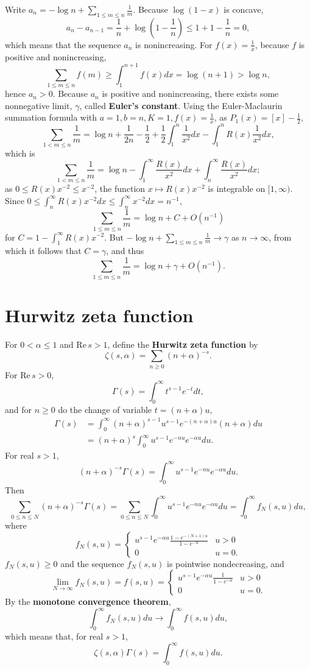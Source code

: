 \documentclass{article}
\def\Re{\ensuremath{\mathrm{Re}}\,}
\theoremstyle{definition}
\theoremstyle{definition}
\begin{document}
Write $a_n  = - \log n+ \sum_{1 \leq m \leq n} \frac{1}{m}$. Because $\log(1-x)$ is concave,
\[
a_n - a_{n-1} = \frac{1}{n} + \log\left(1-\frac{1}{n} \right) \leq 1 + 1 - \frac{1}{n}=0,
\] 
which means that the sequence $a_n$ is nonincreasing. For $f(x)=\frac{1}{x}$, because
$f$ is positive and nonincreasing,
\[
\sum_{1 \leq m \leq n} f(m) \geq \int_1^{n+1} f(x) dx = \log(n+1) > \log n,
\]
hence $a_n>0$. Because $a_n$ is positive and nonincreasing, there exists some nonnegative limit,
$\gamma$, called \textbf{Euler's constant}. 
Using the Euler-Maclaurin summation formula with $a=1, b=n, K=1, f(x)=\frac{1}{x}$, as $P_1(x) = [x]-\frac{1}{2}$,
\[
\sum_{1 < m \leq n} \frac{1}{m} = \log n + \frac{1}{2n} - \frac{1}{2} + \frac{1}{2} \int_1^n \frac{1}{x^2} dx - \int_1^n R(x) \frac{1}{x^2} dx,
\]
which is
\[
\sum_{1<m \leq n} \frac{1}{m} = \log n - \int_1^\infty \frac{R(x)}{x^2} dx + \int_n^\infty \frac{R(x)}{x^2} dx;
\]
as $0 \leq R(x) x^{-2} \leq x^{-2}$, the function $x \mapsto R(x)x^{-2}$ is integrable
on $[1,\infty)$. Since $0 \leq \int_n^\infty R(x)x^{-2} dx \leq \int_n^\infty x^{-2} dx = n^{-1}$, 
\[
\sum_{1 \leq m \leq n} \frac{1}{m} = \log n + C + O(n^{-1})
\]
for $C=1-\int_1^\infty R(x)x^{-2}$. But $-\log n + \sum_{1 \leq m \leq n} \frac{1}{m} \to \gamma$ as $n \to \infty$, from which it follows that
$C=\gamma$, and thus
\[
\sum_{1 \leq m \leq n} \frac{1}{m} = \log n + \gamma + O(n^{-1}).
\]



\section{Hurwitz zeta function}
For $0<\alpha \leq 1$ and $\Re s>1$, define the \textbf{Hurwitz zeta function} by
\[
\zeta(s,\alpha) = \sum_{n \geq 0} (n+\alpha)^{-s}.
\]
For $\Re s>0$,
\[
\Gamma(s) = \int_0^\infty t^{s-1} e^{-t} dt,
\]
and for $n \geq 0$ do the change of variable $t = (n+\alpha) u$,
\begin{align*}
\Gamma(s) &= \int_0^\infty (n+\alpha)^{s-1} u^{s-1} e^{-(n+\alpha)u} (n+\alpha) du\\
&=(n+\alpha)^s \int_0^\infty u^{s-1} e^{-nu} e^{-\alpha u} du.
\end{align*}
For real $s>1$,
\[
(n+\alpha)^{-s} \Gamma(s) = \int_0^\infty u^{s-1} e^{-nu} e^{-\alpha u} du.
\]
Then
\[
\sum_{0 \leq n \leq N} (n+\alpha)^{-s} \Gamma(s) = \sum_{0 \leq n \leq N}\int_0^\infty u^{s-1} e^{-nu} e^{-\alpha u} du=\int_0^\infty f_N(s,u) du,
\]
where
\[
f_N(s,u) = \begin{cases}
u^{s-1} e^{-\alpha u} \frac{1-e^{-(N+1)u}}{1-e^{-u}} &u>0\\
0&u=0.
\end{cases}
\]
$f_N(s,u) \geq 0$ and the sequence $f_N(s,u)$ is pointwise nondecreasing, and
\[
\lim_{N \to \infty} f_N(s,u) =  f(s,u) = \begin{cases}
u^{s-1} e^{-\alpha u} \frac{1}{1-e^{-u}} &u>0\\
0&u=0.
\end{cases}
\]
By the \textbf{monotone convergence theorem},
\[
\int_0^\infty f_N(s,u) du \to \int_0^\infty f(s,u)du,
\]
which means that, for real $s>1$,
\[
\zeta(s,\alpha) \Gamma(s) = \int_0^\infty f(s,u) du.
\]
\end{document}
